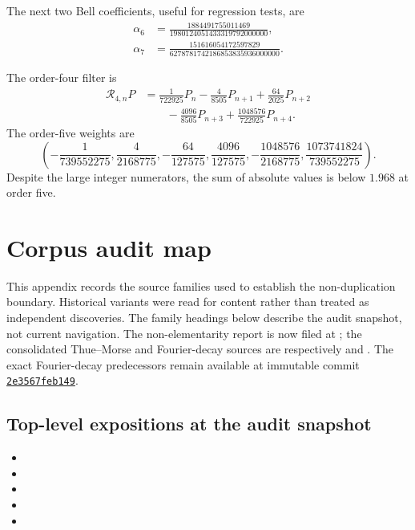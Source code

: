 \documentclass[11pt,oneside]{article}
\numberwithin{equation}{section}
\theoremstyle{definition}
\theoremstyle{remark}
\begin{document}
The next two Bell coefficients, useful for regression tests, are
\begin{align*}
 \alpha_6&=\frac{1884491755011469}
 {1980124051433319792000000},\\
 \alpha_7&=\frac{151616054172597829}
 {6278781742186853835936000000}.
\end{align*}

The order-four filter is
\begin{align*}
 \mathcal R_{4,n}P
 &=\frac1{722925}P_n-\frac4{8505}P_{n+1}
 +\frac{64}{2025}P_{n+2}\\
 &\qquad-\frac{4096}{8505}P_{n+3}
 +\frac{1048576}{722925}P_{n+4}.
\end{align*}
The order-five weights are
\[
 \left(
 -\frac1{739552275},\frac4{2168775},-\frac{64}{127575},
 \frac{4096}{127575},-\frac{1048576}{2168775},
 \frac{1073741824}{739552275}
 \right).
\]
Despite the large integer numerators, the sum of absolute values is below
\(1.968\) at order five.

\section{Corpus audit map}
\label{p2:app:corpus}

This appendix records the source families used to establish the non-duplication
boundary. Historical variants were read for content rather than treated as
independent discoveries.  The family headings below describe the audit
snapshot, not current navigation.  The non-elementarity report is now filed at
;
the consolidated Thue--Morse and Fourier-decay sources are respectively
and
.
The exact Fourier-decay predecessors remain available at immutable commit
\href{https://github.com/VladimirReshetnikov/ProveIt/tree/2e3567feb14947ee3ebcdab11adca64e746ad26f}{\texttt{2e3567feb149}}.

\begingroup
\small
\raggedright
\subsection*{Top-level expositions at the audit snapshot}
\begin{itemize}[leftmargin=8mm]
\item {}
\item {}
\item {}
\item {}
\item {}
\end{itemize}
\end{document}
